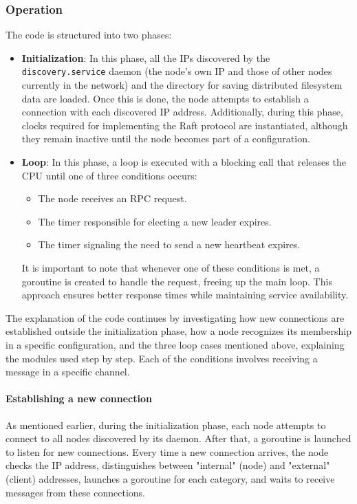 \subsubsection{Operation} \label{operation}
The code is structured into two phases:
\begin{itemize}
  \item \textbf{Initialization}: In this phase, all the IPs discovered by the \texttt{discovery.service}
    daemon (the node's own IP and those of other nodes currently in the network) and the 
    directory for saving distributed filesystem data are loaded. Once this is done, the node 
    attempts to establish a connection with each discovered IP address. Additionally, during 
    this phase, clocks required for implementing the Raft protocol are instantiated, although 
    they remain inactive until the node becomes part of a configuration.
  \item \textbf{Loop}: In this phase, a loop is executed with a blocking call that releases the 
    CPU until one of three conditions occurs:
    \begin{itemize}
      \item The node receives an RPC request.
      \item The timer responsible for electing a new leader expires.
      \item The timer signaling the need to send a new heartbeat expires.
    \end{itemize}   
    It is important to note that whenever one of these conditions is met, a goroutine is 
    created to handle the request, freeing up the main loop. This approach ensures better 
    response times while maintaining service availability.
\end{itemize}
The explanation of the code continues by investigating how new connections are established 
outside the initialization phase, how a node recognizes its membership in a specific configuration, 
and the three loop cases mentioned above, explaining the modules used step by step. Each 
of the conditions involves receiving a message in a specific channel.

\paragraph{Establishing a new connection}
As mentioned earlier, during the initialization phase, each node attempts to connect to all 
nodes discovered by its daemon.
After that, a goroutine is launched to listen for new connections. Every time a new connection 
arrives, the node checks the IP address, distinguishes between "internal" (node) and "external"
(client) addresses, launches a goroutine for each category, and waits to receive messages 
from these connections.

